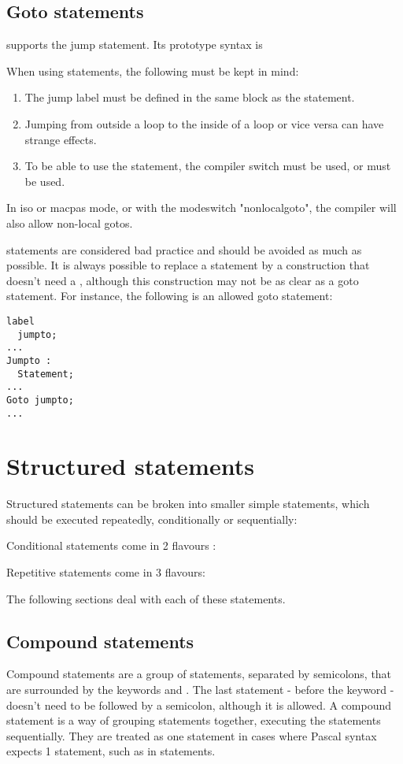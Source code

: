 \subsection{Goto statements}
\fpc supports the  jump statement. Its prototype syntax is

When using  statements, the following must be kept in mind:
\begin{enumerate}
\item The jump label must be defined in the same block as the 
statement.
\item Jumping from outside a loop to the inside of a loop or vice versa can
 have strange effects.
\item To be able to use the  statement, the  compiler
switch must be used, or  must be used.
\end{enumerate}
\begin{remark}
In iso or macpas mode, or with the modeswitch "nonlocalgoto", the compiler
will also allow non-local gotos.
\end{remark}
 statements are considered bad practice and should be avoided as
much as possible. It is always possible to replace a  statement by a
construction that doesn't need a , although this construction may
not be as clear as a goto statement.
For instance, the following is an allowed goto statement:
\begin{verbatim}
label
  jumpto;
...
Jumpto :
  Statement;
...
Goto jumpto;
...
\end{verbatim}

\section{Structured statements}
Structured statements can be broken into smaller simple statements, which
should be executed repeatedly, conditionally  or sequentially:

Conditional statements come in 2 flavours :

Repetitive statements come in 3 flavours:

The following sections deal with each of these statements.

\subsection{Compound statements}
 
Compound statements are a group of statements, separated by semicolons,
that are surrounded by the keywords  and . The
last statement - before the  keyword - doesn't need to be followed by a semicolon, although it is
allowed. A compound statement is a way of grouping statements together,
executing the statements sequentially. They are treated as one statement
in cases where Pascal syntax expects 1 statement, such as in
 statements.


